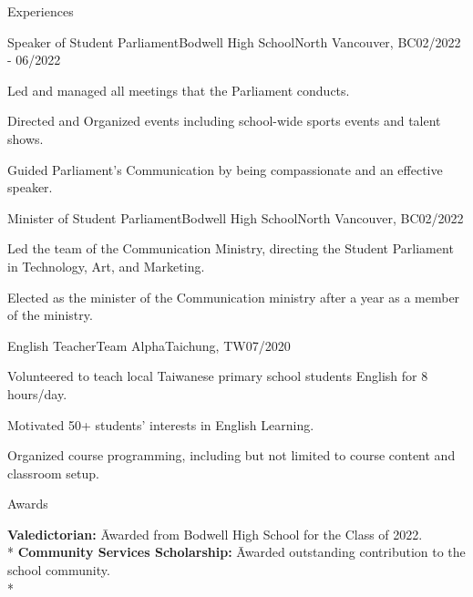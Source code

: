 \documentclass{article}
\newlength{\tabin}
\newlength{\secsep}
\newcommand{\lineunder}{\vspace*{-8pt} \\ \hspace*{-6pt} \hrulefill \\ \vspace*{-15pt}}
\newenvironment{tabbedsection}[1]{
  \begin{list}{}{
      \setlength{\itemsep}{0pt}
      \setlength{\labelsep}{0pt}
      \setlength{\labelwidth}{0pt}
      \setlength{\leftmargin}{\tabin}
      \setlength{\rightmargin}{\tabin}
      \setlength{\listparindent}{0pt}
      \setlength{\parsep}{0pt}
      \setlength{\parskip}{0pt}
      \setlength{\partopsep}{0pt}
      \setlength{\topsep}{#1}
    }
  \item[]
}{\end{list}}
\newenvironment{nospacetabbing}{
    \begin{tabbing}
}{\end{tabbing}\vspace{-1.2em}}
\newenvironment{resume_section}[1]{
  \filbreak
  \vspace{2\secsep}
  \textsc{\large#1}
  \lineunder
  \begin{tabbedsection}{\secsep}
}{\end{tabbedsection}}
\newenvironment{subitems}{
  \renewcommand{\labelitemi}{-}
  \begin{itemize}
      \setlength{\labelsep}{1em}
}{\end{itemize}}
\newenvironment{resume_employer}[4]{
  \vspace{\secsep}
  \textbf{#1} {\footnotesize #3} \hfill {\footnotesize#4} \hspace{-1em} \\
  \small{#2}  
  \vspace{\secsep}
  \begin{tabbedsection}{0pt}
  \begin{subitems}
}{\end{subitems}\end{tabbedsection}}
\begin{document}
\begin{resume_section}{Experiences}
  \begin{resume_employer}{Speaker of Student Parliament}{Bodwell High School}{North Vancouver, BC}{02/2022 - 06/2022}
    \item Led and managed all meetings that the Parliament conducts.
    \item Directed and Organized events including school-wide sports events and talent shows.
    \item Guided Parliament's Communication by being compassionate and an effective speaker.
  \end{resume_employer}

  \begin{resume_employer}{Minister of Student Parliament}{Bodwell High School}{North Vancouver, BC}{02/2022}
    \item Led the team of the Communication Ministry, directing the Student Parliament in Technology, Art, and Marketing.
    \item Elected as the minister of the Communication ministry after a year as a member of the ministry.
  \end{resume_employer}

  \begin{resume_employer}{English Teacher}{Team Alpha}{Taichung, TW}{07/2020}
    \item Volunteered to teach local Taiwanese primary school students English for 8 hours/day.
    \item Motivated 50+ students' interests in English Learning.
    \item Organized course programming, including but not limited to course content and classroom setup.
  \end{resume_employer}

\end{resume_section}
  
\begin{resume_section}{Awards}
  \begin{nospacetabbing}
    \textbf{Valedictorian:} \= Awarded from Bodwell High School for the Class of 2022.\\*
    \textbf{Community Services Scholarship:} \= Awarded outstanding contribution to the school community.\\*
  \end{nospacetabbing}
\end{resume_section}
\end{document}

